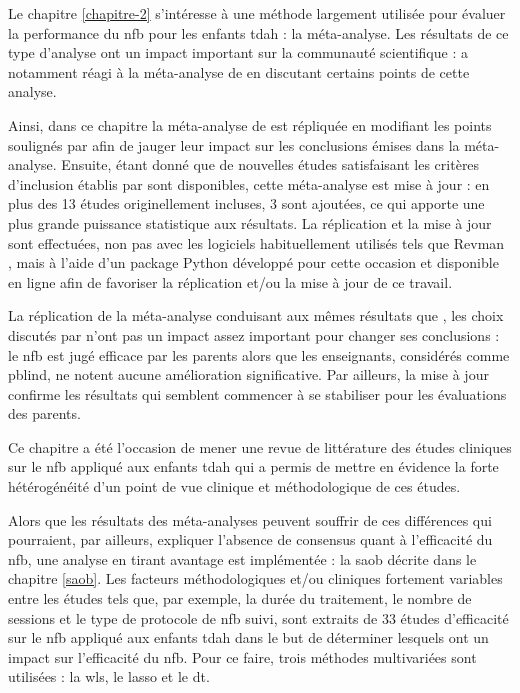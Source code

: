 Le chapitre \ref{chapitre-2} s'intéresse à une méthode largement utilisée pour évaluer la performance du \gls{nfb} pour les enfants \gls{tdah} 
\citep{Sonuga-Barke2013, Micoulaud2014, Cortese2016} : la méta-analyse. Les résultats de ce type d'analyse ont un impact important sur la
communauté scientifique : \citet{Micoulaud2016} a notamment réagi à la méta-analyse de \citet{Cortese2016} en discutant certains points de cette 
analyse. 

Ainsi, dans ce chapitre la méta-analyse de \citet{Cortese2016} est répliquée en modifiant les points soulignés par \citet{Micoulaud2016}
afin de jauger leur impact sur les conclusions émises dans la méta-analyse. Ensuite, étant donné que de nouvelles études satisfaisant les critères d'inclusion
établis par \citet{Cortese2016} sont disponibles, cette méta-analyse est mise à jour : en plus des 13 études originellement incluses, 3
sont ajoutées, ce qui apporte une plus grande puissance statistique aux résultats. La réplication et la mise à jour sont effectuées, non pas avec les logiciels 
habituellement utilisés tels que Revman \citep{Revman}, mais à l'aide d'un package Python développé pour cette occasion et disponible en ligne afin de favoriser 
la réplication et/ou la mise à jour de ce travail. 

La réplication de la méta-analyse conduisant aux mêmes résultats que \citet{Cortese2016}, les choix discutés par \citet{Micoulaud2016} n'ont pas un impact assez
important pour changer ses conclusions : le \gls{nfb} est jugé efficace par les parents alors que les enseignants, considérés comme \gls{pblind}, ne notent aucune
amélioration significative. Par ailleurs, la mise à jour confirme les résultats qui semblent commencer à se stabiliser pour les évaluations des parents.

Ce chapitre a été l'occasion de mener une revue de littérature des études cliniques sur le \gls{nfb} appliqué aux enfants \gls{tdah} 
qui a permis de mettre en évidence la forte hétérogénéité d'un point de vue clinique et méthodologique de ces études. 

Alors que les résultats des méta-analyses peuvent souffrir de ces différences qui pourraient, par ailleurs, expliquer l'absence de consensus quant 
à l'efficacité du \gls{nfb}, une analyse en tirant avantage est implémentée : la \gls{saob} décrite dans le chapitre \ref{saob}. Les facteurs méthodologiques et/ou 
cliniques fortement variables entre les études tels que, par exemple, la durée du traitement, le nombre de sessions et le type de protocole de \gls{nfb} 
suivi, sont extraits de 33 études d'efficacité sur le \gls{nfb} appliqué aux enfants \gls{tdah} dans le but de déterminer lesquels ont un impact sur 
l'efficacité du \gls{nfb}. Pour ce faire, trois méthodes multivariées sont utilisées : la \gls{wls}, le \gls{lasso} et le \gls{dt}. 

